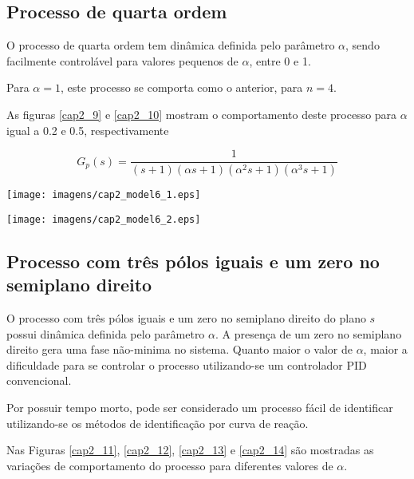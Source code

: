 \subsection{Processo de quarta ordem}
    
    O processo de quarta ordem tem dinâmica definida pelo parâmetro $\alpha$,
    sendo facilmente controlável para valores pequenos de $\alpha$, entre 0 e 1.
    
    Para $\alpha = 1$, este processo se comporta como o anterior, para $n = 4$.
    
    As figuras \ref{cap2_9} e \ref{cap2_10} mostram o comportamento deste
    processo para $\alpha$ igual a 0.2 e 0.5, respectivamente
    
    \begin{equation}
        G_p(s) = \frac{1}{(s+1)(\alpha s+1)(\alpha ^2 s+1)(\alpha ^3 s+1)}
    \end{equation}

    \begin{center}
        \texttt{[image: imagens/cap2\_model6\_1.eps]}
        \label{cap2_9}
    \end{center}
    
    \begin{center}
        \texttt{[image: imagens/cap2\_model6\_2.eps]}
        \label{cap2_10}
    \end{center}

\subsection{Processo com três pólos iguais e um zero no semiplano direito}

    O processo com três pólos iguais e um zero no semiplano direito do plano $s$
    possui dinâmica definida pelo parâmetro $\alpha$. A presença de um
    zero no semiplano direito gera uma fase não-minima no sistema. Quanto maior
    o valor de $\alpha$, maior a dificuldade para se controlar o processo
    utilizando-se um controlador \acs{PID} convencional.
    
    Por possuir tempo morto, pode ser considerado um processo fácil de identificar
    utilizando-se os métodos de identificação por curva de reação.
    
    Nas Figuras \ref{cap2_11}, \ref{cap2_12}, \ref{cap2_13} e \ref{cap2_14}
    são mostradas as variações de comportamento do processo para diferentes
    valores de $\alpha$.

